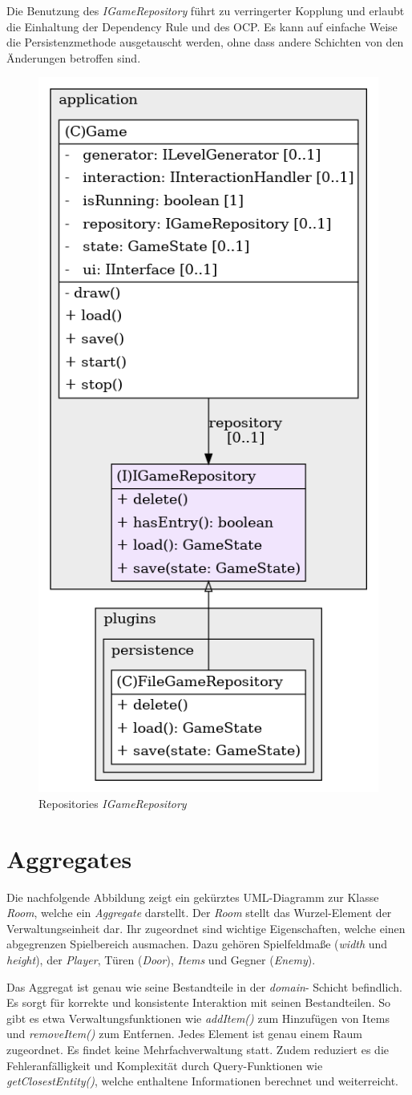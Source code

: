 Die Benutzung des \textit{IGameRepository} führt zu verringerter
Kopplung und erlaubt die Einhaltung der Dependency Rule und des OCP.
Es kann auf einfache Weise die Persistenzmethode ausgetauscht werden,
ohne dass andere Schichten von den Änderungen betroffen sind.

\enlargethispage{2\baselineskip}
\vspace{0.5cm}
\begin{figure}[H]
    \centering
    \includegraphics[width=0.3\linewidth]{Bilder/Visualisierung/IGameRepository_structure.png}
    \caption{Repositories \textit{IGameRepository}}
\end{figure}

\section{Aggregates}
Die nachfolgende Abbildung zeigt ein gekürztes UML-Diagramm zur Klasse
\textit{Room}, welche ein \textit{Aggregate} darstellt. Der \textit{Room}
stellt das Wurzel-Element der Verwaltungseinheit dar. Ihr zugeordnet
sind wichtige Eigenschaften, welche einen abgegrenzen Spielbereich
ausmachen. Dazu gehören Spielfeldmaße (\textit{width} und \textit{height}),
der \textit{Player}, Türen (\textit{Door}), \textit{Items} und Gegner
(\textit{Enemy}).

Das Aggregat ist genau wie seine Bestandteile in der \textit{domain}-
Schicht befindlich. Es sorgt für korrekte und konsistente Interaktion
mit seinen Bestandteilen. So gibt es etwa Verwaltungsfunktionen wie
\textit{addItem()} zum Hinzufügen von Items und \textit{removeItem()}
zum Entfernen. Jedes Element ist genau einem Raum zugeordnet. Es findet
keine Mehrfachverwaltung statt. Zudem reduziert es die Fehleranfälligkeit
und Komplexität durch Query-Funktionen wie \textit{getClosestEntity()},
welche enthaltene Informationen berechnet und weiterreicht. 

